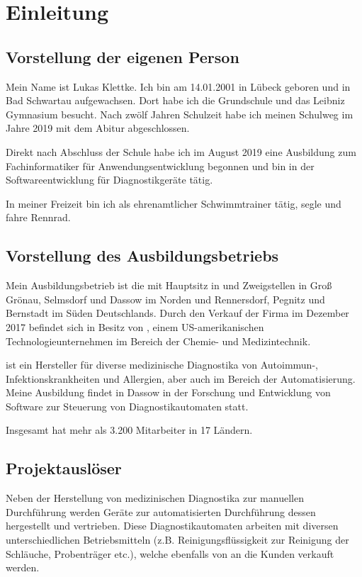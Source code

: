 \section{Einleitung}
\label{sec:Einleitung}

\subsection{Vorstellung der eigenen Person} 
\label{sec:eigene Person}
Mein Name ist Lukas Klettke. Ich bin am 14.01.2001 in Lübeck geboren und in Bad Schwartau aufgewachsen. Dort habe ich die Grundschule und das Leibniz Gymnasium besucht. Nach zwölf Jahren Schulzeit habe ich meinen Schulweg im Jahre 2019 mit dem Abitur abgeschlossen.

Direkt nach Abschluss der Schule habe ich im August 2019 eine Ausbildung zum Fachinformatiker für Anwendungsentwicklung begonnen und bin in der Softwareentwicklung für Diagnostikgeräte tätig.

In meiner Freizeit bin ich als ehrenamtlicher Schwimmtrainer tätig, segle und fahre Rennrad.

\subsection{Vorstellung des Ausbildungsbetriebs} 
\label{sec:Ausbildungsbetrieb}
Mein Ausbildungsbetrieb ist die {\betriebName} mit Hauptsitz in {\betriebOrt} und Zweigstellen in Groß Grönau, Selmsdorf und Dassow im Norden und Rennersdorf, Pegnitz und Bernstadt im Süden Deutschlands. Durch den Verkauf der Firma im Dezember 2017 befindet sich {\betriebNameKzf} in Besitz von {\mutterBetriebName}, einem US-amerikanischen Technologieunternehmen im Bereich der Chemie- und Medizintechnik.

{\betriebNameKzf} ist ein Hersteller für diverse medizinische Diagnostika von Autoimmun-, Infektionskrankheiten und Allergien, aber auch im Bereich der Automatisierung. Meine Ausbildung findet in Dassow in der Forschung und Entwicklung von Software zur Steuerung von Diagnostikautomaten statt.

Insgesamt hat {\betriebNameKzf} mehr als 3.200 Mitarbeiter in 17 Ländern.

\subsection{Projektauslöser} 
\label{sec:Projektauslöser}
Neben der Herstellung von medizinischen Diagnostika zur manuellen Durchführung werden Geräte zur automatisierten Durchführung dessen hergestellt und vertrieben. Diese Diagnostikautomaten arbeiten mit diversen unterschiedlichen Betriebsmitteln (z.B. Reinigungsflüssigkeit zur Reinigung der Schläuche, Probenträger etc.), welche ebenfalls von {\betriebNameKzf} an die Kunden verkauft werden.

